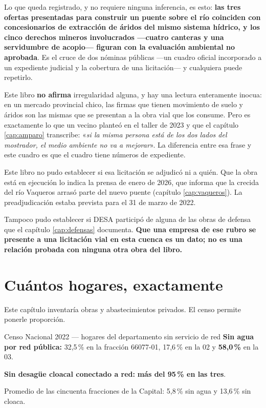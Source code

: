 \begin{cautela}
Lo que queda registrado, y no requiere ninguna inferencia, es esto: \textbf{las tres ofertas presentadas para construir un puente sobre el río coinciden con concesionarios de extracción de áridos del mismo sistema hídrico, y los cinco derechos mineros involucrados ---cuatro canteras y una servidumbre de acopio--- figuran con la evaluación ambiental no aprobada}. Es el cruce de dos nóminas públicas ---un cuadro oficial incorporado a un expediente judicial y la cobertura de una licitación--- y cualquiera puede repetirlo.

Este libro \textbf{no afirma} irregularidad alguna, y hay una lectura enteramente inocua: en un mercado provincial chico, las firmas que tienen movimiento de suelo y áridos son las mismas que se presentan a la obra vial que los consume. Pero es exactamente lo que un vecino planteó en el taller de 2023 y que el capítulo \ref{cap:amparo} transcribe: «\textit{si la misma persona está de los dos lados del mostrador, el medio ambiente no va a mejorar}». La diferencia entre esa frase y este cuadro es que el cuadro tiene números de expediente.
\end{cautela}

\begin{cautela}
Este libro no pudo establecer si esa licitación se adjudicó ni a quién. Que la obra está en ejecución lo indica la prensa de enero de 2026, que informa que la crecida del río Vaqueros arrasó parte del nuevo puente (capítulo \ref{cap:vaqueros}). La preadjudicación estaba prevista para el 31 de marzo de 2022.

Tampoco pudo establecer si DESA participó de alguna de las obras de defensa que el capítulo \ref{cap:defensas}
documenta. \textbf{Que una empresa de ese rubro se presente a una licitación vial en esta
cuenca es un dato; no es una relación probada con ninguna otra obra del libro.}
\end{cautela}

\section{Cuántos hogares, exactamente}

Este capítulo inventaría obras y abastecimientos privados. El censo permite ponerle proporción.

\begin{ficha}{Censo Nacional 2022 --- hogares del departamento sin servicio de red}
\textbf{Sin agua por red pública:} 32,5\,\% en la fracción 66077-01, 17,6\,\% en la 02 y \textbf{58,0\,\%} en la 03.

\textbf{Sin desagüe cloacal conectado a red:} \textbf{más del 95\,\% en las tres}.

Promedio de las cincuenta fracciones de la Capital: 5,8\,\% sin agua y 13,6\,\% sin cloaca.
\end{ficha}

